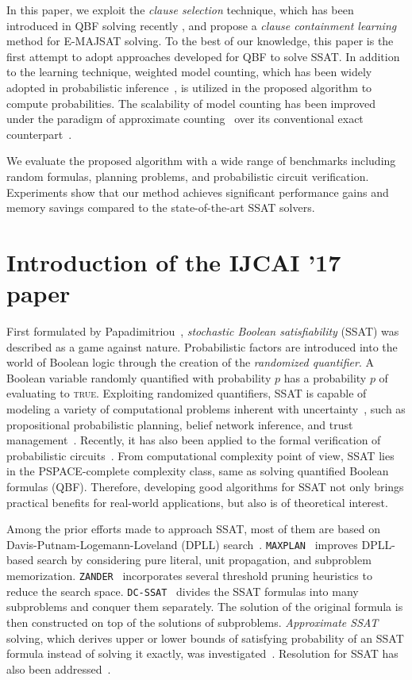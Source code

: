 In this paper, we exploit the \textit{clause selection} technique, which has been introduced in QBF solving recently \cite{Janota2015,Rabe2015}, and
propose a \textit{clause containment learning} method for E-MAJSAT solving.
To the best of our knowledge, this paper is the first attempt to adopt approaches developed for QBF to solve SSAT.
In addition to the learning technique, weighted model counting, which has been widely adopted in probabilistic inference~\cite{Sang2005BayesianInference,Chavira2008}, is utilized in the proposed algorithm to compute probabilities.
The scalability of model counting has been improved under the paradigm of approximate counting~\cite{Chakraborty2016} over its conventional exact counterpart~\cite{Sang2004,Sang2005ModelCounting}.

We evaluate the proposed algorithm with a wide range of benchmarks including random formulas,
planning problems, and probabilistic circuit verification.
Experiments show that our method achieves significant performance gains and memory savings compared to the state-of-the-art SSAT solvers.

\section{Introduction of the IJCAI '17 paper}
First formulated by Papadimitriou~\cite{Papadimitriou1985}, \textit{stochastic Boolean satisfiability} (SSAT) was described as a game against nature.
Probabilistic factors are introduced into the world of Boolean logic through the creation of the \textit{randomized quantifier}.
A Boolean variable randomly quantified with probability $p$ has a probability $p$ of evaluating to \textsc{true}.
Exploiting randomized quantifiers, SSAT is capable of modeling a variety of computational problems inherent with uncertainty~\cite{Hnich2011}, such as propositional probabilistic planning, belief network inference, and trust management~\cite{SATHandbook-SSAT}.
Recently, it has also been applied to the formal verification of probabilistic circuits~\cite{LeeTC18ProbDesign}.
From computational complexity point of view, SSAT lies in the PSPACE-complete complexity class, same as solving quantified Boolean formulas (QBF).
Therefore, developing good algorithms for SSAT not only brings practical benefits for real-world applications, but also is of theoretical interest.

Among the prior efforts made to approach SSAT, most of them are based on Davis-Putnam-Logemann-Loveland (DPLL) search~\cite{Davis1962}.
\texttt{MAXPLAN}~\cite{Majercik1998} improves DPLL-based search by considering pure literal, unit propagation, and subproblem memorization.
\texttt{ZANDER}~\cite{Majercik2003} incorporates several threshold pruning heuristics to reduce the search space.
\texttt{DC-SSAT}~\cite{Majercik2005} divides the SSAT formulas into many subproblems and conquer them separately.
The solution of the original formula is then constructed on top of the solutions of subproblems.
\textit{Approximate SSAT} solving, which derives upper or lower bounds of satisfying probability of an SSAT formula instead of solving it exactly, was investigated~\cite{Majercik2007}.
Resolution for SSAT has also been addressed~\cite{Teige2010}.

